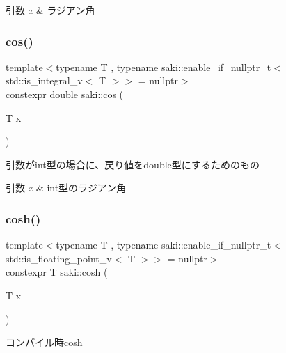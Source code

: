 \begin{DoxyParams}{引数}
{\em x} & ラジアン角 \\
\hline
\end{DoxyParams}
\mbox{\label{namespacesaki_ab1f49aa2d1182883ae8b4c01b346cc88}} 
\subsubsection{\texorpdfstring{cos()}{cos()}\hspace{0.1cm}{\footnotesize\ttfamily [2/2]}}
{\footnotesize\ttfamily template$<$typename T , typename saki\+::enable\+\_\+if\+\_\+nullptr\+\_\+t$<$ std\+::is\+\_\+integral\+\_\+v$<$ T $>$$>$  = nullptr$>$ \\
constexpr double saki\+::cos (\begin{DoxyParamCaption}\item[{T}]{x }\end{DoxyParamCaption})}



引数がint型の場合に、戻り値をdouble型にするためのもの 


\begin{DoxyParams}{引数}
{\em x} & int型のラジアン角 \\
\hline
\end{DoxyParams}
\mbox{\label{namespacesaki_a0f8167af6da5c9eb510d33dadae13708}} 
\subsubsection{\texorpdfstring{cosh()}{cosh()}\hspace{0.1cm}{\footnotesize\ttfamily [1/2]}}
{\footnotesize\ttfamily template$<$typename T , typename saki\+::enable\+\_\+if\+\_\+nullptr\+\_\+t$<$ std\+::is\+\_\+floating\+\_\+point\+\_\+v$<$ T $>$$>$  = nullptr$>$ \\
constexpr T saki\+::cosh (\begin{DoxyParamCaption}\item[{T}]{x }\end{DoxyParamCaption})}



コンパイル時cosh 

\mbox{\label{namespacesaki_afe248729248030bd5858469409e902d2}} 
